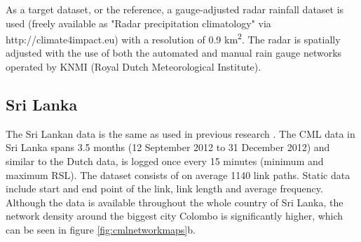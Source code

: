 \documentclass[twocolumn, 10pt, a4paper]{article}
\begin{document}
	As a target dataset, or the reference, a gauge-adjusted radar rainfall dataset is used (freely available as "Radar precipitation climatology" via http://climate4impact.eu) with a resolution of 0.9 km\textsuperscript{2}. The radar is spatially adjusted with the use of both the automated and  manual rain gauge networks operated by KNMI (Royal Dutch Meteorological Institute).
	
	
	\subsection{Sri Lanka}
	The Sri Lankan data is the same as used in previous research .
	The CML data in Sri Lanka spans 3.5 months (12 September 2012 to 31 December 2012) and similar to the Dutch data, is logged once every 15 minutes (minimum and maximum RSL). The dataset consists of on average 1140 link paths. Static data include start and end point of the link, link length and average frequency. Although the data is available throughout the whole country of Sri Lanka, the network density around the biggest city Colombo is significantly higher, which can be seen in figure \ref{fig:cmlnetworkmaps}b.
	
	
	
\end{document}
